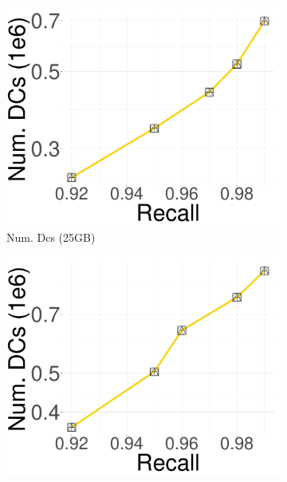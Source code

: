 \begin{figure}[htbp]
    \begin{subfigure}[b]{0.28\textwidth}
        \captionsetup{justification=centering}
	\centering	
        \includegraphics[width=\textwidth]{../img/oigas/PQVSPQS/25GB/deep_10_DC.pdf}
        \caption{Num. Dcs (25GB)}
        \label{fig:SPQ:25GB_DC}
    \end{subfigure}
    \hspace{0.4cm}
    \begin{subfigure}[b]{0.28\textwidth}
        \captionsetup{justification=centering}
	\centering	
        \includegraphics[width=\textwidth]{../img/oigas/PQVSPQS/100GB/deep_10_DC.pdf}

\end{subfigure}
\end{figure}
